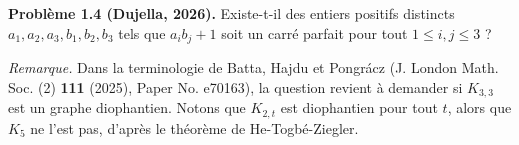 \textbf{Problème 1.4 (Dujella, 2026).} Existe-t-il des entiers positifs distincts $a_1, a_2, a_3, b_1, b_2, b_3$ tels que $a_ib_j + 1$ soit un carré parfait pour tout $1 \leqslant i,j \leqslant 3$ ?

\medskip

\textit{Remarque.} Dans la terminologie de Batta, Hajdu et Pongrácz (J. London Math. Soc. (2) \textbf{111} (2025), Paper No. e70163), la question revient à demander si $K_{3,3}$ est un graphe diophantien. Notons que $K_{2,t}$ est diophantien pour tout $t$, alors que $K_5$ ne l'est pas, d'après le théorème de He-Togbé-Ziegler.
